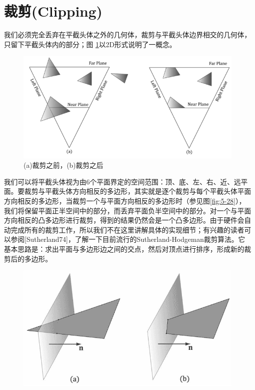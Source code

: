 \documentclass[11pt,a4paper,oldfontcommands]{memoir}
\begin{document}
{\section{裁剪(Clipping)}
\begin{flushleft}
我们必须完全丢弃在平截头体之外的几何体，裁剪与平截头体边界相交的几何体，只留下平截头体内的部分；图 \ref{fig:5-27}以2D形式说明了一概念。
\begin{figure}[h]
    \includegraphics[width=\textwidth]{5-27}
    \centering
    \caption{(a)裁剪之前，(b)裁剪之后}
    \label{fig:5-27}
\end{figure}
我们可以将平截头体视为由6个平面界定的空间范围：顶、底、左、右、近、远平面。要裁剪与平截头体方向相反的多边形，其实就是逐个裁剪与每个平截头体平面方向相反的多边形，当裁剪一个与平面方向相反的多边形时（参见图\ref{fig:5-28}），我们将保留平面正半空间中的部分，而丢弃平面负半空间中的部分。对一个与平面方向相反的凸多边形进行裁剪，得到的结果仍然会是一个凸多边形。由于硬件会自动完成所有的裁剪工作，所以我们不在这里讲解具体的实现细节；有兴趣的读者可以参阅[Sutherland74]，了解一下目前流行的Sutherland-Hodgeman裁剪算法。它基本思路是：求出平面与多边形边之间的交点，然后对顶点进行排序，形成新的裁剪后的多边形。\\
\begin{figure}[h]
    \includegraphics[width=\textwidth]{5-28}

\end{figure}
\end{flushleft}}
\end{document}
